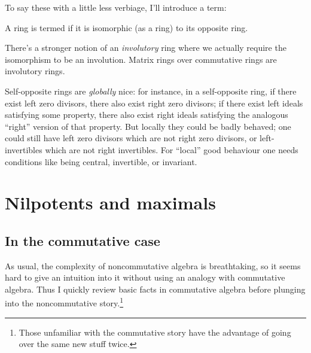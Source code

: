 \documentclass[a4paper]{amsart}
\begin{document}
To say these with a little less verbiage, I'll introduce a term:

\begin{definer}
  A ring is termed  if it is
  isomorphic (as a ring) to its opposite ring.
\end{definer}

There's a stronger notion of an {\em involutory} ring where we
actually require the isomorphism to be an involution. Matrix rings
over commutative rings are involutory rings.

Self-opposite rings are {\em globally} nice: for instance, in a
self-opposite ring, if there exist left zero divisors, there also
exist right zero divisors; if there exist left ideals satisfying some
property, there also exist right ideals satisfying the analogous
``right'' version of that property. But locally they could be badly
behaved; one could still have left zero divisors which are not right
zero divisors, or left-invertibles which are not right
invertibles. For ``local'' good behaviour one needs conditions like
being central, invertible, or invariant.

\section{Nilpotents and maximals}

\subsection{In the commutative case}

As usual, the complexity of noncommutative algebra is breathtaking, so
it seems hard to give an intuition into it without using an analogy
with commutative algebra. Thus I quickly review basic facts in
commutative algebra before plunging into the noncommutative
story.\footnote{Those unfamiliar with the commutative story have the
  advantage of going over the same new stuff twice.}
\end{document}

